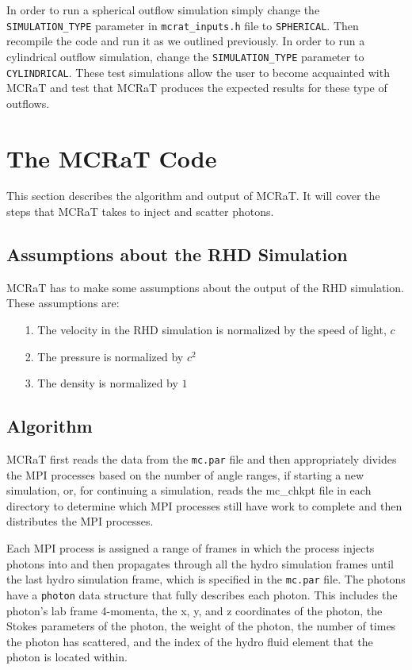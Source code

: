 \documentclass[12pt,a4paper]{article}
\begin{document}
 In order to run a spherical outflow simulation simply change the \texttt{SIMULATION\_TYPE} parameter in \texttt{mcrat\_inputs.h} file to \texttt{SPHERICAL}. Then recompile the code and run it as we outlined previously. In order to run a cylindrical outflow simulation, change the \texttt{SIMULATION\_TYPE} parameter to \texttt{CYLINDRICAL}. These test simulations allow the user to become acquainted with MCRaT and test that MCRaT produces the expected results for these type of outflows.
 

\section{The MCRaT Code}
This section describes the algorithm and output of MCRaT. It will cover the steps that MCRaT takes to inject and scatter photons.

\subsection{Assumptions about the RHD Simulation}
MCRaT has to make some assumptions about the output of the RHD simulation. These assumptions are:
\begin{itemize}
\item[1.] The velocity in the RHD simulation is normalized by the speed of light, $c$ 
\item[2.] The pressure is normalized by $c^2$
\item[3.] The density is normalized by $1$
\end{itemize}

\subsection{Algorithm}\label{algorithm}

MCRaT first reads the data from the \texttt{mc.par} file and then appropriately divides the MPI processes based on the number of angle ranges, if starting a new simulation, or, for continuing a simulation, reads the mc\_chkpt file in each directory to determine which MPI processes still have work to complete and then distributes the MPI processes. 

Each MPI process is assigned a range of frames in which the process injects photons into and then propagates through all the hydro simulation frames until the last hydro simulation frame, which is specified in the \texttt{mc.par} file. The photons have a \texttt{photon} data structure that fully describes each photon. This includes the photon's lab frame 4-momenta, the x, y, and z coordinates of the photon, the Stokes parameters of the photon, the weight of the photon, the number of times the photon has scattered, and the index of the hydro fluid element that the photon is located within.
\end{document}
